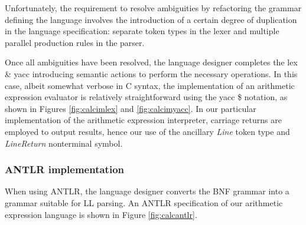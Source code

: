 \documentclass[preprint]{elsarticle}
\begin{document}
Unfortunately, the requirement to resolve ambiguities by refactoring the grammar defining the language involves the introduction of a certain degree of duplication in the language specification: separate token types in the lexer and multiple parallel production rules in the parser.

Once all ambiguities have been resolved, the language designer completes the lex \& yacc introducing semantic actions to perform the necessary operations.
In this case, albeit somewhat verbose in C syntax, the implementation of an arithmetic expression evaluator is relatively straightforward using the yacc \$ notation, as shown in Figures \ref{fig:calcimlex} and \ref{fig:calcimyacc}.
In our particular implementation of the arithmetic expression interpreter, carriage returns are employed to output results, hence our use of the ancillary \emph{Line} token type and \emph{LineReturn} nonterminal symbol.


\subsubsection{ANTLR implementation}

When using ANTLR, the language designer converts the BNF grammar into a grammar suitable for LL parsing.
An ANTLR specification of our arithmetic expression language is shown in Figure \ref{fig:calcantlr}.
\end{document}
